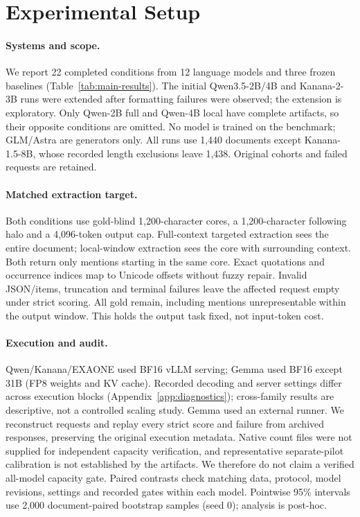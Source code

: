 \section{Experimental Setup}
\label{sec:setup}

\paragraph{Systems and scope.}
We report 22 completed conditions from 12 language models and three frozen baselines (Table~\ref{tab:main-results}). The initial Qwen3.5-2B/4B and Kanana-2-3B runs were extended after formatting failures were observed; the extension is exploratory. Only Qwen-2B full and Qwen-4B local have complete artifacts, so their opposite conditions are omitted. No model is trained on the benchmark; GLM/Astra are generators only. All runs use 1,440 documents except Kanana-1.5-8B, whose recorded length exclusions leave 1,438. Original cohorts and failed requests are retained.

\paragraph{Matched extraction target.}
Both conditions use gold-blind 1,200-character cores, a 1,200-character following halo and a 4,096-token output cap. Full-context targeted extraction sees the entire document; local-window extraction sees the core with surrounding context. Both return only mentions starting in the same core. Exact quotations and occurrence indices map to Unicode offsets without fuzzy repair. Invalid JSON/items, truncation and terminal failures leave the affected request empty under strict scoring. All gold remain, including mentions unrepresentable within the output window. This holds the output task fixed, not input-token cost.

\paragraph{Execution and audit.}
Qwen/Kanana/EXAONE used BF16 vLLM serving; Gemma used BF16 except 31B (FP8 weights and KV cache). Recorded decoding and server settings differ across execution blocks (Appendix~\ref{app:diagnostics}); cross-family results are descriptive, not a controlled scaling study. Gemma used an external runner. We reconstruct requests and replay every strict score and failure from archived responses, preserving the original execution metadata. Native count files were not supplied for independent capacity verification, and representative separate-pilot calibration is not established by the artifacts. We therefore do not claim a verified all-model capacity gate. Paired contrasts check matching data, protocol, model revisions, settings and recorded gates within each model. Pointwise 95\% intervals use 2,000 document-paired bootstrap samples (seed 0); analysis is post-hoc.
